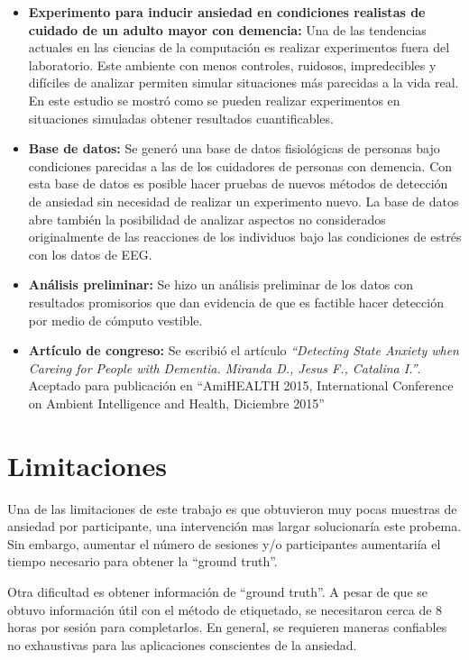 	\begin{itemize}
		\item \textbf{Experimento para inducir ansiedad en condiciones realistas de cuidado de un adulto mayor con demencia:} Una de las tendencias actuales en las ciencias de la computaci\'on es realizar experimentos fuera del laboratorio. Este ambiente con menos controles, ruidosos, impredecibles y dif\'iciles de analizar permiten simular situaciones m\'as parecidas a la vida real. En este estudio se mostr\'o como se pueden realizar experimentos en situaciones simuladas obtener resultados cuantificables.

	\item \textbf{Base de datos:} Se gener\'o una base de datos fisiol\'ogicas de personas bajo condiciones parecidas a las de los cuidadores de personas con demencia. Con esta base de datos es posible hacer pruebas de nuevos m\'etodos de detecci\'on de ansiedad sin necesidad de realizar un experimento nuevo. La base de datos abre tambi\'en la posibilidad de analizar aspectos no considerados originalmente de las reacciones de los individuos bajo las condiciones de estr\'es con los datos de EEG.

	\item \textbf{An\'alisis preliminar:} Se hizo un an\'alisis preliminar de los datos con resultados promisorios que dan evidencia de que es factible hacer detecci\'on por medio de c\'omputo vestible.
	\item \textbf{Art\'iculo de congreso:} Se escribi\'o el art\'iculo \textit{``Detecting State Anxiety when Careing for People with Dementia. Miranda D., Jesus F., Catalina I.''}. Aceptado para publicaci\'on en ``AmiHEALTH 2015, International Conference on Ambient Intelligence and Health, Diciembre 2015''
	\end{itemize}
\section{Limitaciones}
        Una de las limitaciones de este trabajo es que obtuvieron muy pocas muestras de ansiedad por participante, una intervenci\'on mas largar solucionar\'ia este probema. Sin embargo, aumentar el n\'umero de sesiones y/o participantes aumentari\'ia el tiempo necesario para obtener la ``ground truth''.

	Otra dificultad es obtener informaci\'on de ``ground truth''. A pesar de que se obtuvo informaci\'on \'util con el m\'etodo de etiquetado, se necesitaron cerca de 8 horas por sesi\'on para completarlos. En general, se requieren maneras confiables no exhaustivas para las aplicaciones conscientes de la ansiedad.

